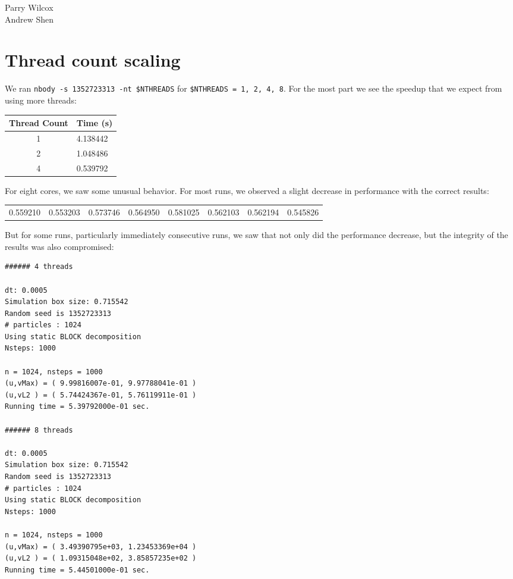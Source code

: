 \documentclass{article}[12pt;letterpaper]
\begin{document}
\begin{flushleft}
Parry Wilcox \\
Andrew Shen
\end{flushleft}

\section{Thread count scaling}

We ran \texttt{nbody -s 1352723313 -nt \$NTHREADS} for \texttt{\$NTHREADS = 1,
2, 4, 8}. For the most part we see the speedup that we expect from using more
threads:

\begin{tabular}{c l}
Thread Count & Time (s) \\
\hline{}
1 & 4.138442 \\
2 & 1.048486 \\
4 & 0.539792 \\
\end{tabular}

For eight cores, we saw some unusual behavior. For most runs, we observed a
slight decrease in performance with the correct results:

\begin{tabular}{l l l l l l l l}
0.559210 & 0.553203 & 0.573746 & 0.564950 &
0.581025 & 0.562103 & 0.562194 & 0.545826
\end{tabular}

But for some runs, particularly immediately consecutive runs, we saw that not
only did the performance decrease, but the integrity of the results was also
compromised:

\begin{verbatim}
###### 4 threads 

dt: 0.0005
Simulation box size: 0.715542
Random seed is 1352723313
# particles : 1024
Using static BLOCK decomposition
Nsteps: 1000

n = 1024, nsteps = 1000
(u,vMax) = ( 9.99816007e-01, 9.97788041e-01 )
(u,vL2 ) = ( 5.74424367e-01, 5.76119911e-01 )
Running time = 5.39792000e-01 sec.

###### 8 threads 

dt: 0.0005
Simulation box size: 0.715542
Random seed is 1352723313
# particles : 1024
Using static BLOCK decomposition
Nsteps: 1000

n = 1024, nsteps = 1000
(u,vMax) = ( 3.49390795e+03, 1.23453369e+04 )
(u,vL2 ) = ( 1.09315048e+02, 3.85857235e+02 )
Running time = 5.44501000e-01 sec.
\end{verbatim}
\end{document}
